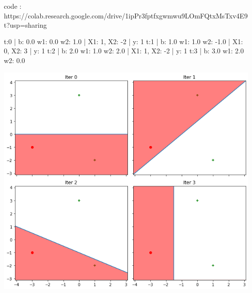 \begin{solution}
code :\newline
https://colab.research.google.com/drive/1ipPr3fptfxgwmwu9LOmFQtxMsTxv4E9t?usp=sharing \newline

t:0 | b: 0.0 w1: 0.0 w2: 1.0 |  X1: 1, X2: -2 | y: 1 \newline
t:1 | b: 1.0 w1: 1.0 w2: -1.0 |  X1: 0, X2: 3 | y: 1 \newline
t:2 | b: 2.0 w1: 1.0 w2: 2.0 |  X1: 1, X2: -2 | y: 1 \newline
t:3 | b: 3.0 w1: 2.0 w2: 0.0 \newline

\includegraphics[scale=.5]{set1/images/PerceptVisH1.png}

\end{solution}

